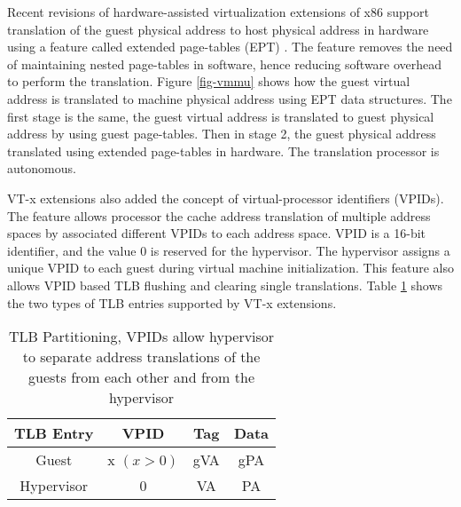 

Recent revisions of hardware-assisted virtualization extensions of x86 support translation of the guest physical address to host physical address
in hardware using a feature called extended page-tables (EPT) \cite{intel-sdm-vol3}.
The feature removes the need of maintaining nested page-tables in software, hence reducing software overhead to perform the translation.
Figure \ref{fig-vmmu} shows how the guest virtual address is translated to machine physical address using EPT data structures.
The first stage is the same, the guest virtual address is translated to guest physical address by using guest page-tables.
Then in stage 2, the guest physical address translated using extended page-tables in hardware. 
The translation processor is autonomous.

VT-x extensions also added the concept of virtual-processor identifiers (VPIDs). 
The feature allows processor the cache address translation of multiple address spaces by associated different VPIDs to each address space.
VPID is a 16-bit identifier, and the value 0 is reserved for the hypervisor.
The hypervisor assigns a unique VPID to each guest during virtual machine initialization.
This feature also allows VPID based TLB flushing and clearing single translations.
Table \ref{vpid-entries} shows the two types of TLB entries supported by VT-x extensions.

\begin{table}[!h]
\centering
\begin{tabular}{|c||c|c|c|}  
\hline
	\textbf{TLB Entry}	&	\textbf{VPID}	&	\textbf{Tag} &	\textbf{Data}\\ \hline \hline
	Guest			&	x $(x > 0)$		&		gVA 	 & 	gPA			 \\ \hline
	Hypervisor		&	0				&		VA 		 &  PA			 \\ \hline
\end{tabular}
\caption{TLB Partitioning, VPIDs allow hypervisor to separate address translations of the guests from each other and from the hypervisor} 
\label{vpid-entries}
\end{table}


